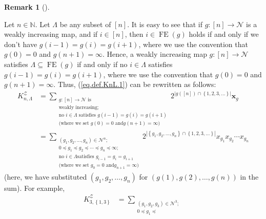\documentclass[numbers=enddot,12pt,final,onecolumn,notitlepage]{scrartcl}%
\theoremstyle{definition}
\newtheorem{remk}[theo]{Remark}
\newenvironment{remark}[1][]
{\begin{remk}[#1]\begin{leftbar}}
{\end{leftbar}\end{remk}}
\let\sumnonlimits\sum
\renewcommand{\sum}{\sumnonlimits\limits}
\begin{document}
\begin{remark}
\label{rmk.KnL.concrete}Let $n\in\mathbb{N}$. Let $\Lambda$ be any subset of
$\left[  n\right]  $. It is easy to see that if $g:\left[  n\right]
\rightarrow\mathcal{N}$ is a weakly increasing map, and if $i\in\left[
n\right]  $, then $i\in\operatorname*{FE}\left(  g\right)  $ holds if and only
if we don't have $g\left(  i-1\right)  =g\left(  i\right)  =g\left(
i+1\right)  $, where we use the convention that $g\left(  0\right)  =0$ and
$g\left(  n+1\right)  =\infty$. Hence, a weakly increasing map $g:\left[
n\right]  \rightarrow\mathcal{N}$ satisfies $\Lambda\subseteq
\operatorname*{FE}\left(  g\right)  $ if and only if no $i\in\Lambda$
satisfies $g\left(  i-1\right)  =g\left(  i\right)  =g\left(  i+1\right)  $,
where we use the convention that $g\left(  0\right)  =0$ and $g\left(
n+1\right)  =\infty$. Thus, (\ref{eq.def.KnL.1}) can be rewritten as follows:%
\begin{align}
K_{n,\Lambda}^{\mathcal{Z}}  &  =\sum_{\substack{g:\left[  n\right]
\rightarrow\mathcal{N}\text{ is}\\\text{weakly increasing;}\\\text{no }%
i\in\Lambda\text{ satisfies }g\left(  i-1\right)  =g\left(  i\right)
=g\left(  i+1\right)  \\\text{(where we set }g\left(  0\right)  =0\text{ and
}g\left(  n+1\right)  =\infty\text{)}}}2^{\left\vert g\left(  \left[
n\right]  \right)  \cap\left\{  1,2,3,\ldots\right\}  \right\vert }%
\mathbf{x}_{g}\nonumber\\
&  =\sum_{\substack{\left(  g_{1},g_{2},\ldots,g_{n}\right)  \in
\mathcal{N}^{n};\\0\preccurlyeq g_{1}\preccurlyeq g_{2}\preccurlyeq
\cdots\preccurlyeq g_{n}\preccurlyeq\infty;\\\text{no }i\in\Lambda\text{
satisfies }g_{i-1}=g_{i}=g_{i+1}\\\text{(where we set }g_{0}=0\text{ and
}g_{n+1}=\infty\text{)}}}2^{\left\vert \left\{  g_{1},g_{2},\ldots
,g_{n}\right\}  \cap\left\{  1,2,3,\ldots\right\}  \right\vert }x_{g_{1}%
}x_{g_{2}}\cdots x_{g_{n}} \label{eq.rmk.KnL.concrete.2}%
\end{align}
(here, we have substituted $\left(  g_{1},g_{2},\ldots,g_{n}\right)  $ for
$\left(  g\left(  1\right)  ,g\left(  2\right)  ,\ldots,g\left(  n\right)
\right)  $ in the sum). For example,
\begin{align*}
K_{3,\left\{  1,3\right\}  }^{\mathcal{Z}}  &  =\sum_{\substack{\left(
g_{1},g_{2},g_{3}\right)  \in\mathcal{N}^{3};\\0\preccurlyeq g_{1}\preccurlyeq
}}
\end{align*}
\end{remark}
\end{document}
